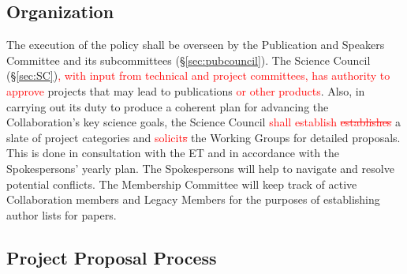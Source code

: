 \documentclass[12pt]{article}
\newcommand{\Comment}[1]{\textcolor{Blue}{(Comment: #1)}}
\newcommand{\revision}[1]{\textcolor{Red}{#1}}
\begin{document}
\subsection{Organization}
The execution of the policy shall be overseen by the Publication and Speakers Committee and its subcommittees (\S\ref{sec:pubcouncil}). 
The Science Council (\S\ref{sec:SC})\revision{, with input from technical and project committees, has authority to approve} projects that may lead to publications \revision{or other products}.
Also, in carrying out its duty to produce a coherent plan for advancing the Collaboration's key science goals, the Science Council \revision{shall establish \sout{establishes}} a slate of project categories and \revision{solicit\sout{s}} the Working Groups for detailed proposals.
This is done in consultation with the ET and in accordance with the Spokespersons' yearly plan.
The Spokespersons will help to navigate and resolve potential conflicts.
The Membership Committee will keep track of active Collaboration members and Legacy Members for the purposes of establishing author lists for papers.


\subsection{Project Proposal Process}
\label{sec:pubprop}

\end{document}
